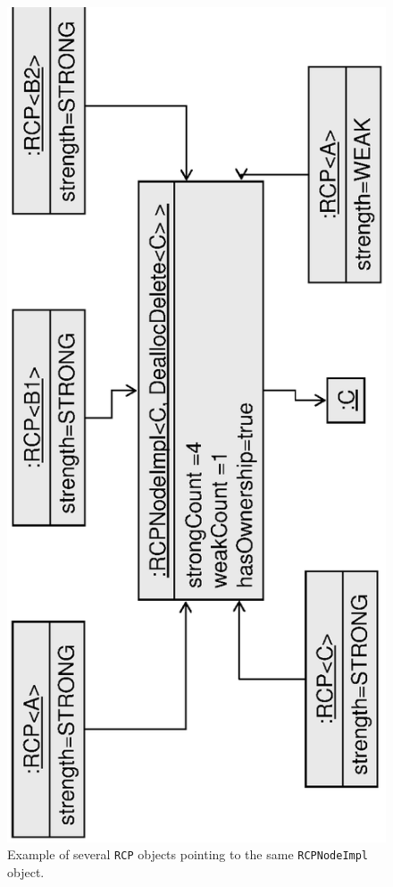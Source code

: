\documentclass[pdf,ps2pdf,11pt]{SANDreport}
\begin{document}
{\bsinglespace
\begin{figure}
\begin{center}
\includegraphics*[angle=270,scale=0.65]{RCPEx1}
\end{center}
\caption{
\label{fig:RCPEx1}
Example of several {}\texttt{RCP} objects pointing to the same
{}\texttt{RCPNodeImpl} object.  }
\end{figure}
\esinglespace}
\end{document}
